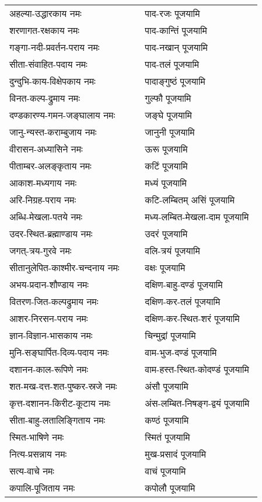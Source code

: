 \begin{supertabular}{p{0.525\linewidth}p{0.45\linewidth}}
अहल्या-उद्धारकाय नमः & पाद-रजः पूजयामि \\
शरणागत-रक्षकाय नमः & पाद-कान्तिं पूजयामि \\
गङ्गा-नदी-प्रवर्तन-पराय नमः & पाद-नखान् पूजयामि \\
सीता-संवाहित-पदाय नमः & पाद-तलं पूजयामि \\
दुन्दुभि-काय-विक्षेपकाय नमः & पादाङ्गुष्ठं पूजयामि \\
विनत-कल्प-द्रुमाय नमः & गुल्फौ पूजयामि \\
दण्डकारण्य-गमन-जङ्घालाय नमः & जङ्घे पूजयामि \\
जानु-न्यस्त-कराम्बुजाय नमः & जानुनी पूजयामि \\
वीरासन-अध्यासिने नमः & ऊरू पूजयामि \\
पीताम्बर-अलङ्कृताय नमः & कटिं पूजयामि \\
आकाश-मध्यगाय नमः & मध्यं पूजयामि \\
अरि-निग्रह-पराय नमः & कटि-लम्बितम् असिं पूजयामि \\
अब्धि-मेखला-पतये नमः & मध्य-लम्बित-मेखला-दाम पूजयामि \\
उदर-स्थित-ब्रह्माण्डाय नमः & उदरं पूजयामि \\
जगत्-त्रय-गुरवे नमः & वलि-त्रयं पूजयामि \\
सीतानुलेपित-काश्मीर-चन्दनाय नमः & वक्षः पूजयामि \\
अभय-प्रदान-शौण्डाय नमः & दक्षिण-बाहु-दण्डं पूजयामि \\
वितरण-जित-कल्पद्रुमाय नमः & दक्षिण-कर-तलं पूजयामि \\
आशर-निरसन-पराय नमः & दक्षिण-कर-स्थित-शरं पूजयामि \\
ज्ञान-विज्ञान-भासकाय नमः & चिन्मुद्रां पूजयामि \\
मुनि-सङ्घार्पित-दिव्य-पदाय नमः & वाम-भुज-दण्डं पूजयामि \\
दशानन-काल-रूपिणे नमः & वाम-हस्त-स्थित-कोदण्डं पूजयामि \\
शत-मख-दत्त-शत-पुष्कर-स्रजे नमः & अंसौ पूजयामि \\
कृत्त-दशानन-किरीट-कूटाय नमः & अंस-लम्बित-निषङ्ग-द्वयं पूजयामि \\
सीता-बाहु-लतालिङ्गिताय नमः & कण्ठं पूजयामि \\
स्मित-भाषिणे नमः & स्मितं पूजयामि \\
नित्य-प्रसन्नाय नमः & मुख-प्रसादं पूजयामि \\
सत्य-वाचे नमः & वाचं पूजयामि \\
कपालि-पूजिताय नमः & कपोलौ पूजयामि \\

\end{supertabular}

